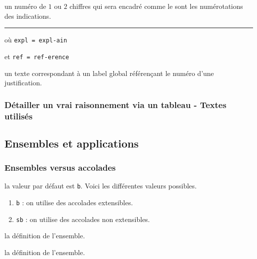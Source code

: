 \documentclass[12pt,a4paper]{article}
\theoremstyle{definition}
\newcommand\separation{
	\medskip
	\hfill\rule{0.5\textwidth}{0.75pt}\hfill
	\medskip
}
\newcommand\extraspace{
	\vspace{0.25em}
}
\newcommand\mwhyprefix[2]{%
	\texttt{#1 = #1-#2}%
}
\begin{document}
\IDarg{} un numéro de $1$ ou $2$ chiffres qui sera encadré comme le sont les numérotations des indications.


\separation


 où \quad \mwhyprefix{expl}{ain}
                             et \mwhyprefix{ref}{erence}

\IDarg{} un texte correspondant à un label global référençant le numéro d'une justification.


\subsubsection{Détailler un \og vrai \fg{} raisonnement via un tableau - Textes utilisés}





\extraspace



\subsection{Ensembles et applications}

\subsubsection{Ensembles versus accolades}


\IDoption{} la valeur par défaut est \verb+b+.  Voici les différentes valeurs possibles.
\begin{enumerate}
	\item \verb+b+ : on utilise des accolades extensibles.

	\item \verb+sb+ : on utilise des accolades non extensibles.
\end{enumerate}

\IDarg{} la définition de l'ensemble.

\IDarg{} la définition de l'ensemble.


\end{document}
